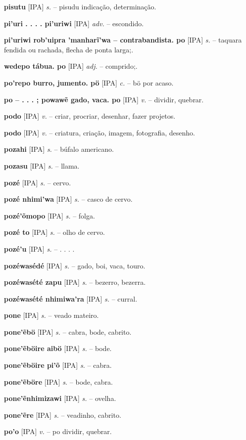 \textbf{pisutu} [IPA] \textit{s.} -- pisudu indicação, determinação.

\textbf{pi'uri . . . . pi'uriwi} [IPA] \textit{adv.} -- escondido.

\textbf{pi'uriwi rob'uipra 'manharĩ'wa -- contrabandista. po} [IPA] \textit{s.} -- taquara fendida ou rachada, flecha de ponta larga;.

\textbf{wedepo tábua. po} [IPA] \textit{adj.} -- comprido;.

\textbf{po'repo burro, jumento. pö} [IPA] \textit{c.} -- bö por acaso.

\textbf{po -- . . . ; powawẽ gado, vaca. po} [IPA] \textit{v.} -- dividir, quebrar.

\textbf{podo} [IPA] \textit{v.} -- criar, procriar, desenhar, fazer projetos.

\textbf{podo} [IPA] \textit{v.} -- criatura, criação, imagem, fotografia, desenho.

\textbf{pozahi} [IPA] \textit{s.} -- búfalo americano.

\textbf{pozasu} [IPA] \textit{s.} -- llama.

\textbf{pozé} [IPA] \textit{s.} -- cervo.

\textbf{pozé nhimi'wa} [IPA] \textit{s.} -- casco de cervo.

\textbf{pozé'õmopo} [IPA] \textit{s.} -- folga.

\textbf{pozé to} [IPA] \textit{s.} -- olho de cervo.

\textbf{pozé'u} [IPA] \textit{s.} -- . . . .

\textbf{pozéwasédé} [IPA] \textit{s.} -- gado, boi, vaca, touro.

\textbf{pozéwasété zapu} [IPA] \textit{s.} -- bezerro, bezerra.

\textbf{pozéwasété nhimiwa'ra} [IPA] \textit{s.} -- curral.

\textbf{pone} [IPA] \textit{s.} -- veado mateiro.

\textbf{pone'ẽbö} [IPA] \textit{s.} -- cabra, bode, cabrito.

\textbf{pone'ẽböire aibö} [IPA] \textit{s.} -- bode.

\textbf{pone'ẽböire pi'õ} [IPA] \textit{s.} -- cabra.

\textbf{pone'ẽböre} [IPA] \textit{s.} -- bode, cabra.

\textbf{pone'ẽnhimizawi} [IPA] \textit{s.} -- ovelha.

\textbf{pone'ẽre} [IPA] \textit{s.} -- veadinho, cabrito.

\textbf{po'o} [IPA] \textit{v.} -- po dividir, quebrar.

